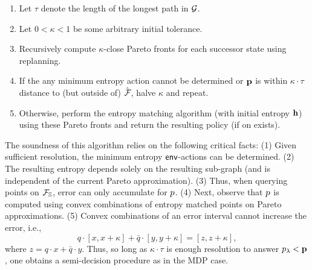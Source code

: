 \begin{mdframed}
\begin{enumerate}
\item Let $\tau$ denote the length of the longest path in $\mathcal{G}$.
\item Let $0 < \kappa < 1$ be some arbitrary initial tolerance.
\item Recursively compute $\kappa$-close Pareto fronts for each successor state using replanning.
\item If the any minimum entropy action cannot be determined or $\mathbf{p}$ is within $\kappa\cdot \tau$ distance to (but outside of) $\hat{\mathcal{F}_{}}$,
  halve $\kappa$ and repeat.
\item Otherwise, perform the entropy matching algorithm (with initial
  entropy $\mathbf{h}$) using these Pareto fronts and return the
  resulting policy (if on exists).
\end{enumerate}  
\end{mdframed}
The soundness of this algorithm relies on the following critical
facts: (1) Given sufficient resolution, the minimum entropy
$\mathsf{env}$-actions can be determined. (2) The
resulting entropy depends solely on
the resulting sub-graph (and is independent of the current Pareto
approximation). (3) Thus, when querying points on
$\mathcal{F}_{\mathbb{S}}$, error can only accumulate for $p$. (4) Next,
observe that $p$ is computed using convex combinations of entropy
matched points on Pareto approximations. (5) Convex combinations of an error interval cannot
increase the error, i.e.,
\begin{equation}
  q\cdot[x, x + \kappa] + \bar{q}\cdot[y, y + \kappa] = [z, z + \kappa],
\end{equation}
where $z = q\cdot x + \bar{q}\cdot y$.
Thus, so long as $\kappa\cdot\tau$ is enough resolution to answer $p_\lambda <
\mathbf{p}$, one obtains a semi-decision procedure as in the MDP
case.


